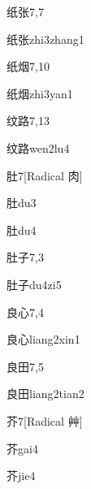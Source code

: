 \begin{entry}{纸张}{7,7}
  \begin{phonetics}{纸张}{zhi3zhang1}
  \end{phonetics}
\end{entry}

\begin{entry}{纸烟}{7,10}
  \begin{phonetics}{纸烟}{zhi3yan1}
  \end{phonetics}
\end{entry}

\begin{entry}{纹路}{7,13}
  \begin{phonetics}{纹路}{wen2lu4}
  \end{phonetics}
\end{entry}

\begin{entry}{肚}{7}[Radical 肉]
  \begin{phonetics}{肚}{du3}
  \end{phonetics}
  \begin{phonetics}{肚}{du4}
  \end{phonetics}
\end{entry}

\begin{entry}{肚子}{7,3}
  \begin{phonetics}{肚子}{du4zi5}
  \end{phonetics}
\end{entry}

\begin{entry}{良心}{7,4}
  \begin{phonetics}{良心}{liang2xin1}
  \end{phonetics}
\end{entry}

\begin{entry}{良田}{7,5}
  \begin{phonetics}{良田}{liang2tian2}
  \end{phonetics}
\end{entry}

\begin{entry}{芥}{7}[Radical 艸]
  \begin{phonetics}{芥}{gai4}
  \end{phonetics}
  \begin{phonetics}{芥}{jie4}
  \end{phonetics}
\end{entry}

